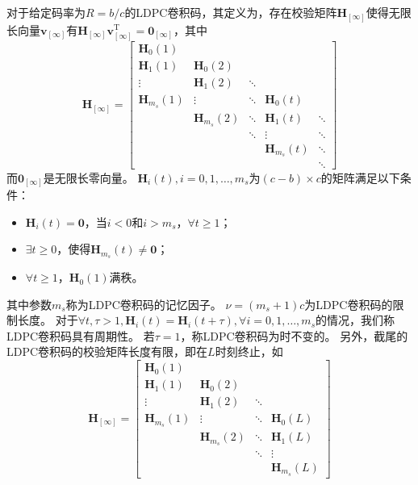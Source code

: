 对于给定码率为$R=b/c$的LDPC卷积码，其定义为，存在校验矩阵$\mathbf{H}_{[\infty]}$使得无限长向量$\mathbf{v}_{[\infty]}$有$\mathbf{H}_{[\infty]}\mathbf{v}_{[\infty]}^\text{T} =\mathbf{0}_{[\infty]}$，其中
\begin{equation}
    \mathbf{H}_{[\infty]} = \left[
          \begin{array}{ccccc}
            \mathbf{H}_0(1) & & & & \\
            \mathbf{H}_1(1) & \mathbf{H}_0(2) & & & \\
            \vdots & \mathbf{H}_1(2) & \ddots & & \\
            \mathbf{H}_{m_s}(1) & \vdots & \ddots & \mathbf{H}_0(t) & \\
             & \mathbf{H}_{m_s}(2) & \ddots & \mathbf{H}_1(t) & \ddots\\
             & & \ddots & \vdots & \ddots \\
             & & & \mathbf{H}_{m_s}(t) & \ddots \\
             & & & & \ddots
          \end{array} \right]
\end{equation}
而$\mathbf{0}_{[\infty]}$是无限长零向量。
$\mathbf{H}_i(t),i=0,1,\dots,m_s$为$(c-b)\times c$的矩阵满足以下条件：
\begin{itemize}
\item $\mathbf{H}_i(t)=\mathbf{0}$，当$i<0$和$i>m_s$，$\forall t \geq 1$；
\item $\exists t\geq 0$，使得$\mathbf{H}_{m_s}(t) \neq \mathbf{0}$；
\item $\forall t \geq 1$，$\mathbf{H}_0(1)$满秩。
\end{itemize}

其中参数$m_s$称为LDPC卷积码的记忆因子。
$\nu = (m_s+1)c$为LDPC卷积码的限制长度。
对于$\forall t,\tau>1,\mathbf{H}_i(t) = \mathbf{H}_i(t+\tau),\forall i = 0,1,\dots,m_s$的情况，我们称LDPC卷积码具有周期性。
若$\tau=1$，称LDPC卷积码为时不变的。
另外，截尾的LDPC卷积码的校验矩阵长度有限，即在$L$时刻终止，如
\begin{equation}
    \mathbf{H}_{[\infty]} = \left[
          \begin{array}{cccc}
            \mathbf{H}_0(1) & & & \\
            \mathbf{H}_1(1) & \mathbf{H}_0(2) & & \\
            \vdots & \mathbf{H}_1(2) & \ddots & \\
            \mathbf{H}_{m_s}(1) & \vdots & \ddots & \mathbf{H}_0(L) \\
             & \mathbf{H}_{m_s}(2) & \ddots & \mathbf{H}_1(L) \\
             & & \ddots & \vdots \\
             & & & \mathbf{H}_{m_s}(L)
          \end{array} \right]
\end{equation}


